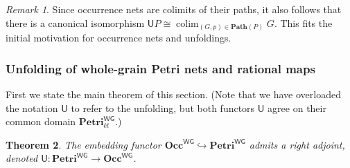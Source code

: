 \documentclass[11pt,a4paper]{article}
\theoremstyle{plain}
\newtheorem{theorem}{Theorem}[section]
\theoremstyle{definition}
\theoremstyle{remark}
\newtheorem{remark}[theorem]{Remark}
\newcommand{\WGPetri}{\mathbf{Petri}^{\mathsf{WG}}}
\newcommand{\WGOcc}{\mathbf{Occ}^{\mathsf{WG}}}
\newcommand{\U}{\mathsf{U}}
\DeclareMathOperator*{\colim}{colim}
\newcommand{\Path}{\mathbf{Path}}
\begin{document}
\begin{remark}
Since occurrence nets are colimits of their paths, it also follows that there is a canonical isomorphism $\U P \cong \colim_{(G, p) \in \Path(P)} G$. This fits the initial motivation for occurrence nets and unfoldings. 
\end{remark}


\subsubsection{Unfolding of whole-grain Petri nets and rational maps}

First we state the main theorem of this section. (Note that we have overloaded the notation $\U$ to refer to the unfolding, but both functors $\U$ agree on their common domain $\WGPetri_{\textit{\'et}}$.)
\begin{theorem}
\label{thm:whole-grain-unfolding}
The embedding functor $\WGOcc \hookrightarrow \WGPetri$ admits a right adjoint, denoted $\U :\WGPetri \to \WGOcc$.
\end{theorem}
\end{document}
